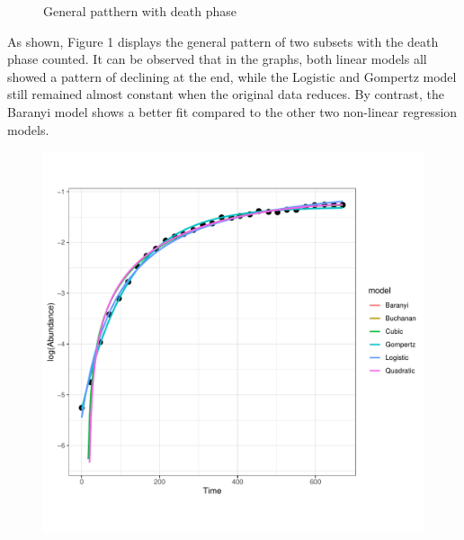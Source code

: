 \documentclass[11pt, oneside]{article}
\begin{document}
\begin{figure}[H]
\begin{center}
\begin{minipage}{.5\textwidth}
			\end{minipage}
			\end{center}
		\caption{General patthern with death phase}
		\end{figure}
		
		\noindent As shown, Figure 1 displays the general pattern of two subsets with the death phase counted. It can be observed that in the graphs, both linear models all showed a pattern of declining at the end, while the Logistic and Gompertz model still remained almost constant when the original data reduces. By contrast, the Baranyi model shows a better fit compared to the other two non-linear regression models. 
				
		\begin{figure}[H]
			\begin{center}
			\begin{minipage}{.5\textwidth}
				\centering
				\includegraphics[page=41, scale = 0.5]{plot_subsets.pdf}
			\end{minipage}%
			\begin{minipage}{.5\textwidth}
				\centering

\end{minipage}
\end{center}
\end{figure}
\end{document}
